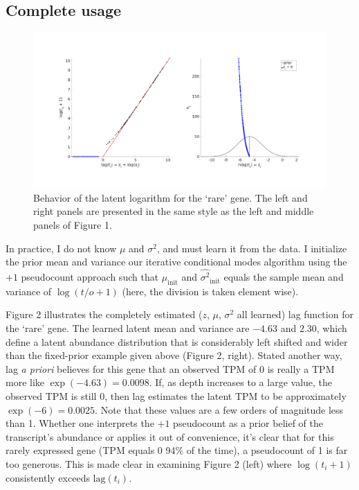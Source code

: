 \documentclass[11pt]{article}
\begin{document}
\subsection{Complete usage}
\begin{figure}[h]
\centering
\includegraphics[trim={1cm 3cm 1cm 2cm},clip,width=\textwidth]{figure2.png}
\caption{Behavior of the latent logarithm for the `rare' gene. The left and right panels are presented in the same style as the left and middle panels of Figure 1.}
\end{figure}

In practice, I do not know $\mu$ and $\sigma^2$, and must learn it from the data. I initialize the prior mean and variance our iterative conditional modes algorithm using the $+1$ pseudocount approach such that $\hat{\mu}_{\textrm{init}}$ and $\hat{\sigma^2}_{\textrm{init}}$ equals the sample mean and variance of $\log(t/o + 1)$ (here, the division is taken element wise).

Figure 2 illustrates the completely estimated ($z$, $\mu$, $\sigma^2$ all learned) lag function for the `rare' gene. The learned latent mean and variance are $-4.63$ and $2.30$, which define a latent abundance distribution that is considerably left shifted and wider than the fixed-prior example given above (Figure 2, right). Stated another way, lag \emph{a priori} believes for this gene that an observed TPM of 0 is really a TPM more like $\exp(-4.63) = 0.0098$. If, as depth increases to a large value, the observed TPM is still 0, then lag estimates the latent TPM to be approximately $\exp(-6) = 0.0025$. Note that these values are a few orders of magnitude less than 1. Whether one interprets the $+1$ pseudocount as a prior belief of the transcript's abundance or applies it out of convenience, it's clear that for this rarely expressed gene (TPM equals 0 94$\%$ of the time), a pseudocount of 1 is far too generous. This is made clear in examining Figure 2 (left) where $\log(t_i + 1)$ consistently exceeds $\textrm{lag}(t_i)$. 
\end{document}
